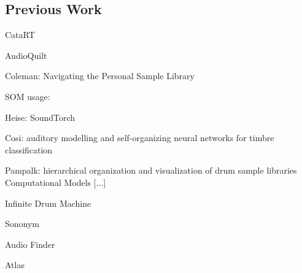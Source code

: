 \subsection{Previous Work}
\label{subsec:previous_work}

CataRT
\citet{schwarz2006}

AudioQuilt
\citet{fried2014}

Coleman: Navigating the Personal Sample Library
\citet{coleman2007}

SOM usage:

Heise: SoundTorch
\citet{heise2008}

Cosi:
auditory modelling and self-organizing neural networks for timbre classification
\citet{cosi1994}

Pampalk:
hierarchical organization and visualization of drum sample libraries
\citet{pampalk2004}
Computational Models [...]
\citet{pampalk2008}

Infinite Drum Machine
\citet{mcdonald2017}

Sononym
\citet{nielsen2018}

Audio Finder
\citet{audiofinder2019}

Atlas
\citet{atlas2018}
